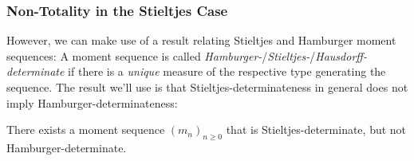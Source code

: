 \documentclass[a4paper]{scrreprt}
\begin{document}
%    

    \subsubsection{Non-Totality in the Stieltjes Case}
    However, we can make use of a result relating Stieltjes and Hamburger moment sequences:
    A moment sequence is called \emph{Hamburger-}/\emph{Stieltjes-}/\emph{Hausdorff-determinate} if there is a \emph{unique} measure of the respective type generating the sequence. The result we'll use is that Stieltjes-determinateness in general does not imply Hamburger-determinateness:
    
    \begin{thm}
        There exists a moment sequence $(m_n)_{n \geq 0}$ that is Stieltjes-determinate, but not Hamburger-determinate.
    \end{thm}
\end{document}
